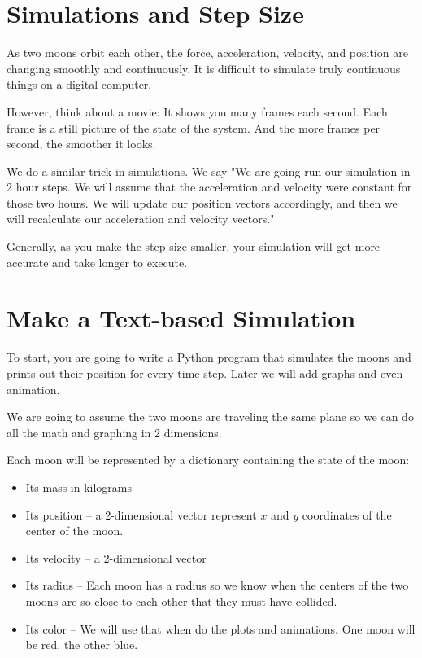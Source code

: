 \section{Simulations and Step Size}

As two moons orbit each other,  the force, acceleration, velocity, and position are changing smoothly and continuously.  It is difficult to simulate truly continuous things on a digital computer.

However,  think about a movie:  It shows you many frames each second.   Each frame is a still picture of the 
state of the system.  And the more frames per second,  the smoother it looks.

We do a similar trick in simulations.   We say "We are going run our simulation in 2 hour steps.   We will assume
that the acceleration and velocity were constant for those two hours.   We will update our position vectors accordingly,  and then we will recalculate our acceleration and velocity vectors."

Generally,  as you make the step size smaller,  your simulation will get more accurate and take longer to execute.

\section{Make a Text-based Simulation}

To start,  you are going to write a Python program that simulates the moons and prints out their
position for every time step.  Later we will add graphs and even animation.

We are going to assume the two moons are traveling the same plane so we can do all the math and graphing 
in 2 dimensions.

Each moon will be represented by a dictionary containing the state of the moon:
\begin{itemize}
\item Its mass in kilograms
\item Its position -- a 2-dimensional vector represent $x$ and $y$ coordinates of the center of the moon.
\item Its velocity -- a 2-dimensional vector
\item Its radius -- Each moon has a radius so we know when the centers of the two moons are so close to each other that they must have collided.
\item Its color -- We will use that when do the plots and animations.  One moon will be red, the other blue.
\end{itemize}

